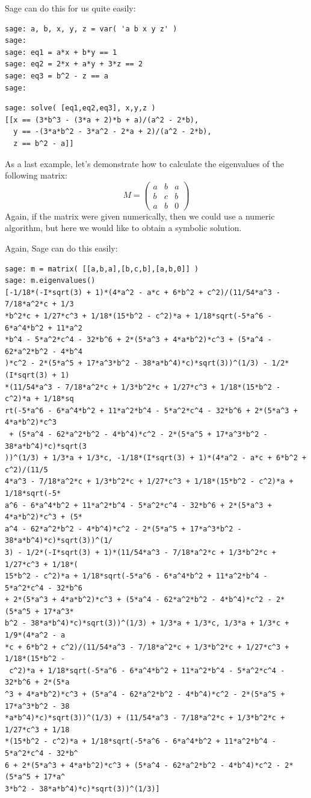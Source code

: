 Sage can do this for us quite easily:

\begin{verbatim}
sage: a, b, x, y, z = var( 'a b x y z' )
sage: 
sage: eq1 = a*x + b*y == 1
sage: eq2 = 2*x + a*y + 3*z == 2
sage: eq3 = b^2 - z == a
sage: 
\end{verbatim}
\begin{verbatim}
sage: solve( [eq1,eq2,eq3], x,y,z )
[[x == (3*b^3 - (3*a + 2)*b + a)/(a^2 - 2*b), 
  y == -(3*a*b^2 - 3*a^2 - 2*a + 2)/(a^2 - 2*b), 
  z == b^2 - a]]
\end{verbatim}

As a last example, let's demonstrate how to calculate the eigenvalues
of the following matrix:
%
\[
M = 
\begin{pmatrix}
a & b & a \\
b & c & b \\
a & b & 0
\end{pmatrix}
\]
% 
Again, if the matrix were given numerically, then we could use a
numeric algorithm, but here we would like to obtain a symbolic
solution.

Again, Sage can do this easily:

\begin{verbatim}
sage: m = matrix( [[a,b,a],[b,c,b],[a,b,0]] )
sage: m.eigenvalues()
[-1/18*(-I*sqrt(3) + 1)*(4*a^2 - a*c + 6*b^2 + c^2)/(11/54*a^3 - 7/18*a^2*c + 1/3
*b^2*c + 1/27*c^3 + 1/18*(15*b^2 - c^2)*a + 1/18*sqrt(-5*a^6 - 6*a^4*b^2 + 11*a^2
*b^4 - 5*a^2*c^4 - 32*b^6 + 2*(5*a^3 + 4*a*b^2)*c^3 + (5*a^4 - 62*a^2*b^2 - 4*b^4
)*c^2 - 2*(5*a^5 + 17*a^3*b^2 - 38*a*b^4)*c)*sqrt(3))^(1/3) - 1/2*(I*sqrt(3) + 1)
*(11/54*a^3 - 7/18*a^2*c + 1/3*b^2*c + 1/27*c^3 + 1/18*(15*b^2 - c^2)*a + 1/18*sq
rt(-5*a^6 - 6*a^4*b^2 + 11*a^2*b^4 - 5*a^2*c^4 - 32*b^6 + 2*(5*a^3 + 4*a*b^2)*c^3
 + (5*a^4 - 62*a^2*b^2 - 4*b^4)*c^2 - 2*(5*a^5 + 17*a^3*b^2 - 38*a*b^4)*c)*sqrt(3
))^(1/3) + 1/3*a + 1/3*c, -1/18*(I*sqrt(3) + 1)*(4*a^2 - a*c + 6*b^2 + c^2)/(11/5
4*a^3 - 7/18*a^2*c + 1/3*b^2*c + 1/27*c^3 + 1/18*(15*b^2 - c^2)*a + 1/18*sqrt(-5*
a^6 - 6*a^4*b^2 + 11*a^2*b^4 - 5*a^2*c^4 - 32*b^6 + 2*(5*a^3 + 4*a*b^2)*c^3 + (5*
a^4 - 62*a^2*b^2 - 4*b^4)*c^2 - 2*(5*a^5 + 17*a^3*b^2 - 38*a*b^4)*c)*sqrt(3))^(1/
3) - 1/2*(-I*sqrt(3) + 1)*(11/54*a^3 - 7/18*a^2*c + 1/3*b^2*c + 1/27*c^3 + 1/18*(
15*b^2 - c^2)*a + 1/18*sqrt(-5*a^6 - 6*a^4*b^2 + 11*a^2*b^4 - 5*a^2*c^4 - 32*b^6 
+ 2*(5*a^3 + 4*a*b^2)*c^3 + (5*a^4 - 62*a^2*b^2 - 4*b^4)*c^2 - 2*(5*a^5 + 17*a^3*
b^2 - 38*a*b^4)*c)*sqrt(3))^(1/3) + 1/3*a + 1/3*c, 1/3*a + 1/3*c + 1/9*(4*a^2 - a
*c + 6*b^2 + c^2)/(11/54*a^3 - 7/18*a^2*c + 1/3*b^2*c + 1/27*c^3 + 1/18*(15*b^2 -
 c^2)*a + 1/18*sqrt(-5*a^6 - 6*a^4*b^2 + 11*a^2*b^4 - 5*a^2*c^4 - 32*b^6 + 2*(5*a
^3 + 4*a*b^2)*c^3 + (5*a^4 - 62*a^2*b^2 - 4*b^4)*c^2 - 2*(5*a^5 + 17*a^3*b^2 - 38
*a*b^4)*c)*sqrt(3))^(1/3) + (11/54*a^3 - 7/18*a^2*c + 1/3*b^2*c + 1/27*c^3 + 1/18
*(15*b^2 - c^2)*a + 1/18*sqrt(-5*a^6 - 6*a^4*b^2 + 11*a^2*b^4 - 5*a^2*c^4 - 32*b^
6 + 2*(5*a^3 + 4*a*b^2)*c^3 + (5*a^4 - 62*a^2*b^2 - 4*b^4)*c^2 - 2*(5*a^5 + 17*a^
3*b^2 - 38*a*b^4)*c)*sqrt(3))^(1/3)]
\end{verbatim}

